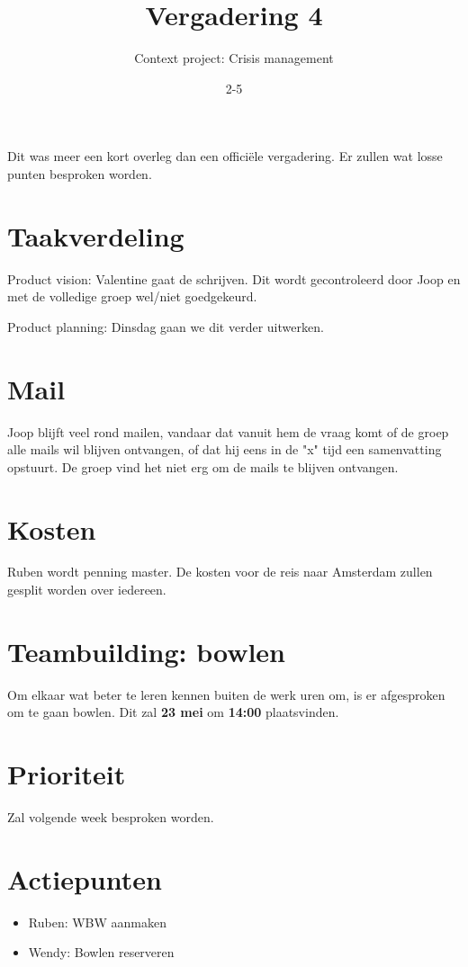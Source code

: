 \documentclass{article}
\begin{document}
\title{Vergadering 4}
\author{Context project: Crisis management}
\date{2-5}
\maketitle 

Dit was meer een kort overleg dan een officiële vergadering. Er zullen wat losse punten besproken worden. 

\section{Taakverdeling} 
Product vision: Valentine gaat de  schrijven. Dit wordt gecontroleerd door Joop en met de volledige groep wel/niet goedgekeurd. 

Product planning: Dinsdag gaan we dit verder uitwerken. 

\section{Mail} 
Joop blijft veel rond mailen, vandaar dat vanuit hem de vraag komt of de groep alle mails wil blijven ontvangen, of dat hij eens in de "x" tijd een samenvatting opstuurt. De groep vind het niet erg om de mails te blijven ontvangen. 

\section{Kosten} 
Ruben wordt penning master. De kosten voor de reis naar Amsterdam zullen gesplit worden over iedereen. 

\section{Teambuilding: bowlen}
Om elkaar wat beter te leren kennen buiten de werk uren om, is er afgesproken om te gaan bowlen. Dit zal \textbf{23 mei} om \textbf{14:00} plaatsvinden.

\section{Prioriteit}
Zal volgende week besproken worden. 



\section{Actiepunten}
\begin{itemize}
\item Ruben: WBW aanmaken
\item Wendy: Bowlen reserveren
\end{itemize}
\end{document}

